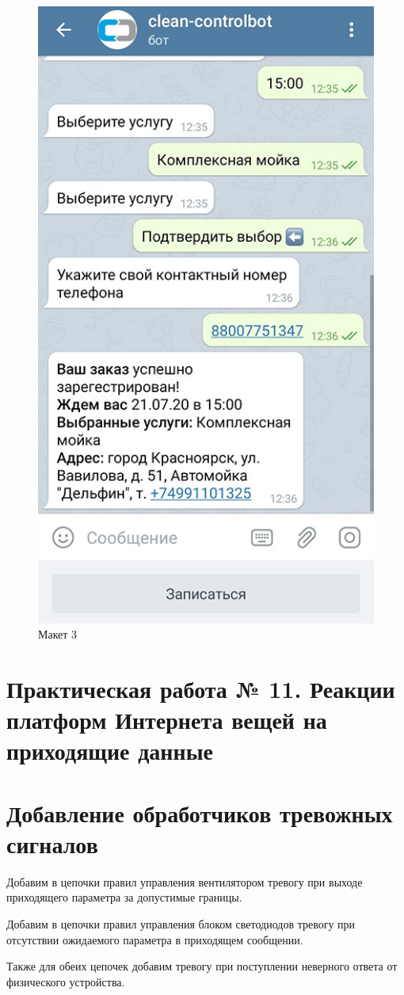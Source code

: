 \documentclass[utf8x]{G7-32} %
\begin{document}
\begin{figure}[h!]
	\centering
	\includegraphics[width=0.5\linewidth]{images/mokups/wash}
	\caption{Макет 3}
	\label{fig:wash}
\end{figure}
\clearpage

\section{Практическая работа № 11. Реакции платформ Интернета вещей на приходящие данные}

\section{Добавление обработчиков тревожных сигналов}
Добавим в цепочки правил управления вентилятором тревогу при выходе приходящего параметра за допустимые границы.

Добавим в цепочки правил управления блоком светодиодов тревогу при отсутствии ожидаемого параметра в приходящем сообщении.
 
 
Также для обеих цепочек добавим тревогу при поступлении неверного ответа от физического устройства.
\end{document}
